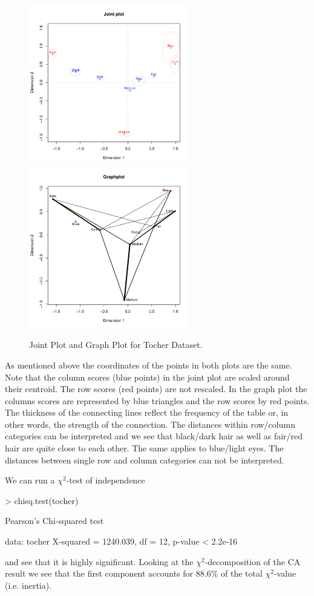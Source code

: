 \documentclass[article]{Z}
\begin{document}
\begin{figure}[h]
\begin{center}
\includegraphics[height=70mm, width=70mm]{tocherjoint.pdf}
\includegraphics[height=70mm, width=70mm]{tochergraph.pdf}
\caption{\label{fig:tocher} Joint Plot and Graph Plot for Tocher Dataset.}
\end{center}
\end{figure}

As mentioned above the coordinates of the points in both plots are the same. Note that the column scores (blue points) in the joint plot are scaled around their centroid. The row scores (red points) are not rescaled. In the graph plot the columns scores are represented by blue triangles and the row scores by red points. The thickness of the connecting lines reflect the frequency of the table or, in other words, the strength of the connection. The distances within row/column categories can be interpreted and we see that black/dark hair as well as fair/red hair are quite close to each other. The same applies to blue/light eyes. The distances between single row and column categories can not be interpreted. 

We can run a $\chi^2$-test of independence
\begin{Schunk}
\begin{Sinput}
> chisq.test(tocher)
\end{Sinput}
\begin{Soutput}
	Pearson's Chi-squared test

data:  tocher 
X-squared = 1240.039, df = 12, p-value < 2.2e-16
\end{Soutput}
\end{Schunk}
and see that it is highly significant. Looking at the $\chi^2$-decomposition of the CA result we see that the first component accounts for 88.6\% of the total $\chi^2$-value (i.e. inertia).
 
\end{document}
